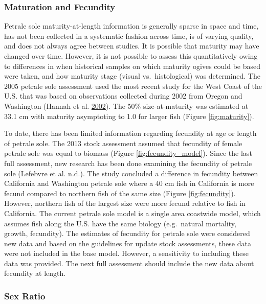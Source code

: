 \documentclass[12pt,]{article}
\begin{document}
\subsubsection{Maturation and Fecundity}\label{maturation-and-fecundity}

Petrale sole maturity-at-length information is generally sparse in space
and time, has not been collected in a systematic fashion across time, is
of varying quality, and does not always agree between studies. It is
possible that maturity may have changed over time. However, it is not
possible to assess this quantitatively owing to differences in when
historical samples on which maturity ogives could be based were taken,
and how maturity stage (visual vs.~histological) was determined. The
2005 petrale sole assessment used the most recent study for the West
Coast of the U.S. that was based on observations collected during 2002
from Oregon and Washington (Hannah et al.
\protect\hyperlink{ref-hannah_length_2002}{2002}). The 50\%
size-at-maturity was estimated at 33.1 cm with maturity asymptoting to
1.0 for larger fish (Figure \ref{fig:maturity}).

To date, there has been limited information regarding fecundity at age
or length of petrale sole. The 2013 stock assessment assumed that
fecundity of female petrale sole was equal to biomass (Figure
\ref{fig:fecundity_model}). Since the last full assessment, new research
has been done examining the fecundity of petrale sole (Lefebvre et al.
n.d.). The study concluded a difference in fecundity between California
and Washington petrale sole where a 40 cm fish in California is more
fecund compared to northern fish of the same size (Figure
\ref{fig:fecundity}). However, northern fish of the largest size were
more fecund relative to fish in California. The current petrale sole
model is a single area coastwide model, which assumes fish along the
U.S. have the same biology (e.g.~natural mortality, growth, fecundity).
The estimates of fecundity for petrale sole were considered new data and
based on the guidelines for update stock assessments, these data were
not included in the base model. However, a sensitivity to including
these data was provided. The next full assessment should include the new
data about fecundity at length.

\subsubsection{Sex Ratio}\label{sex-ratio}
\end{document}
